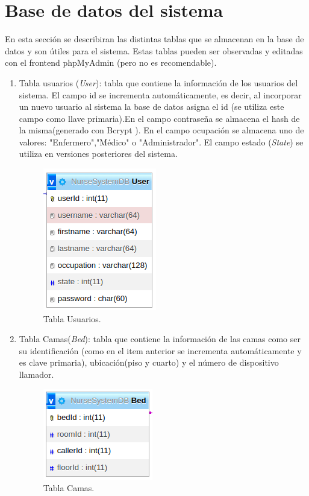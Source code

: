 \section{Base de datos del sistema}
En esta sección se describiran las distintas tablas que se almacenan en la base de datos y son útiles para el sistema. Estas tablas pueden ser observadas y editadas con el frontend phpMyAdmin (pero no es recomendable). 

\begin{enumerate}

\item Tabla usuarios (\textit{User}): tabla que contiene la información de los usuarios del sistema. El campo id se incrementa automáticamente, es decir, al incorporar un nuevo usuario al sistema la base de datos asigna el id (se utiliza este campo como llave primaria).En el campo contraseña se almacena el hash de la misma(generado con Bcrypt \citep{WEBSITE:31}). En el campo ocupación se almacena uno de valores: "Enfermero","Médico" o "Administrador". El campo estado (\textit{State}) se utiliza en versiones posteriores del sistema.

\begin{figure}[ht]
	\centering
	\includegraphics[scale=.6]{./Figures/dB(user).png}
	\caption{Tabla Usuarios.}
	\label{fig:Tabla Usuarios (base de datos)}
\end{figure}

\item Tabla Camas(\textit{Bed}): tabla que contiene la información de las camas como ser su identificación (como en el item anterior se incrementa automáticamente y es clave primaria), ubicación(piso y cuarto) y el número de dispositivo llamador. 

\begin{figure}[ht]
	\centering
	\includegraphics[scale=.6]{./Figures/dB(bed).png}
	\caption{Tabla Camas.}
	\label{fig:Tabla Camas (base de datos)}
\end{figure}


\end{enumerate}
